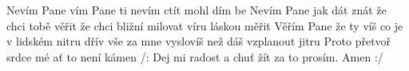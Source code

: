\begin{TEXT}{Nevím Pane}
\SLOKA {}vím Pane ti  nevím  ctít  \NL
{} mohl    dím be 
\SLOKA Nevím Pane jak dát znát že chci tobě věřit \NL
že chci bližní milovat víru láskou měřit 
\SLOKA Věřím Pane že ty víš co je v lidském nitru \NL
dřív vše za mne vyslovíš než dáš vzplanout jitru 
\SLOKA Proto přetvoř srdce mé ať to není kámen \NL
/: Dej mi radost a chuť žít za to prosím. Amen :/ \NL
\end{TEXT}
